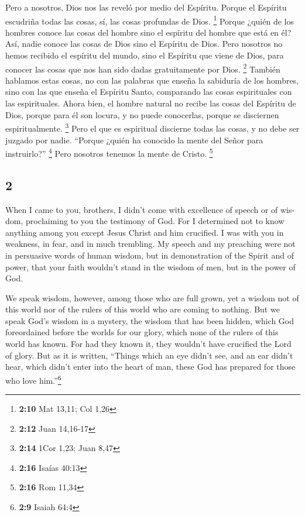 \begin{paracol}{2}
 Pero a nosotros, Dios nos las reveló por medio del
Espíritu. Porque el Espíritu escudriña todas las cosas, sí, las cosas
profundas de Dios. \footnote{\textbf{2:10} Mat 13,11; Col 1,26}
 Porque ¿quién de los hombres conoce las cosas del hombre
sino el espíritu del hombre que está en él? Así, nadie conoce las cosas
de Dios sino el Espíritu de Dios.  Pero nosotros no hemos
recibido el espíritu del mundo, sino el Espíritu que viene de Dios, para
conocer las cosas que nos han sido dadas gratuitamente por Dios.
\footnote{\textbf{2:12} Juan 14,16-17}  También hablamos
estas cosas, no con las palabras que enseña la sabiduría de los hombres,
sino con las que enseña el Espíritu Santo, comparando las cosas
espirituales con las espirituales.  Ahora bien, el hombre
natural no recibe las cosas del Espíritu de Dios, porque para él son
locura, y no puede conocerlas, porque se disciernen espiritualmente.
\footnote{\textbf{2:14} 1Cor 1,23; Juan 8,47}  Pero el
que es espiritual discierne todas las cosas, y no debe ser juzgado por
nadie.  ``Porque ¿quién ha conocido la mente del Señor
para instruirlo?'' \footnote{\textbf{2:16} Isaías 40:13} Pero nosotros
tenemos la mente de Cristo. \footnote{\textbf{2:16} Rom 11,34}

\switchcolumn
\begin{otherlanguage}{english}

\hypertarget{section-3}{%
\section{2}\label{section-3}}

 When I came to you, brothers, I didn't come with
excellence of speech or of wisdom, proclaiming to you the testimony of
God.  For I determined not to know anything among you
except Jesus Christ and him crucified.  I was with you in
weakness, in fear, and in much trembling.  My speech and
my preaching were not in persuasive words of human wisdom, but in
demonstration of the Spirit and of power,  that your faith
wouldn't stand in the wisdom of men, but in the power of God.

 We speak wisdom, however, among those who are full grown,
yet a wisdom not of this world nor of the rulers of this world who are
coming to nothing.  But we speak God's wisdom in a
mystery, the wisdom that has been hidden, which God foreordained before
the worlds for our glory,  which none of the rulers of
this world has known. For had they known it, they wouldn't have
crucified the Lord of glory.  But as it is written,
``Things which an eye didn't see, and an ear didn't hear, which didn't
enter into the heart of man, these God has prepared for those who love
him.''\footnote{\textbf{2:9} Isaiah 64:4}


\end{otherlanguage}
\end{paracol}
